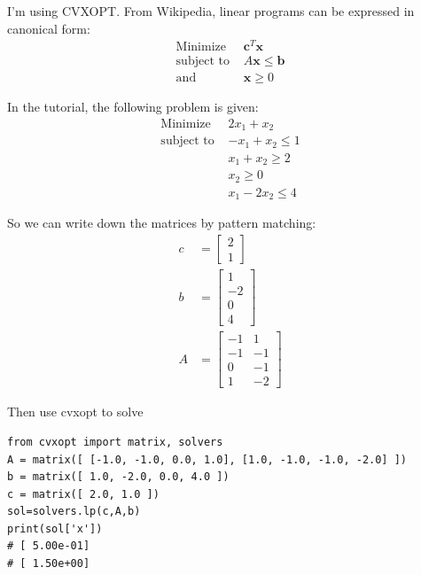 \documentclass[11pt]{article}
\begin{document}
\begin{solution}
I'm using CVXOPT. From Wikipedia, linear programs can be expressed in canonical form:
\begin{align}
    \text{Minimize  } &\bm{c}^T \bm{x} \nonumber \\
    \text{subject to  } &A\bm{x} \leq \bm{b} \nonumber \\
    \text{and  } &\bm{x} \geq 0 \nonumber
\end{align}

In the tutorial, the following problem is given:
\begin{align}
    \text{Minimize  } &2 x_1 + x_2 \nonumber \\
    \text{subject to  } &-x_1 + x_2 \leq 1 \nonumber \\
    &x_1 + x_2 \geq 2 \nonumber \\
    &x_2 \geq 0 \nonumber \\
    &x_1 - 2x_2 \leq 4 \nonumber
\end{align}

So we can write down the matrices by pattern matching:
\begin{align}
    c &= \begin{bmatrix}
         2 \\ 1
         \end{bmatrix} \nonumber \\
    b &= \begin{bmatrix}
         1 \\ -2 \\ 0 \\ 4
         \end{bmatrix} \nonumber \\
    A &= \begin{bmatrix}
         -1 & 1 \\ -1 & -1 \\ 0 & -1 \\ 1 & -2
         \end{bmatrix} \nonumber
\end{align}

Then use cvxopt to solve
\begin{verbatim}
from cvxopt import matrix, solvers
A = matrix([ [-1.0, -1.0, 0.0, 1.0], [1.0, -1.0, -1.0, -2.0] ])
b = matrix([ 1.0, -2.0, 0.0, 4.0 ])
c = matrix([ 2.0, 1.0 ])
sol=solvers.lp(c,A,b)
print(sol['x'])
# [ 5.00e-01]
# [ 1.50e+00]
\end{verbatim}

\end{solution}
\end{document}
